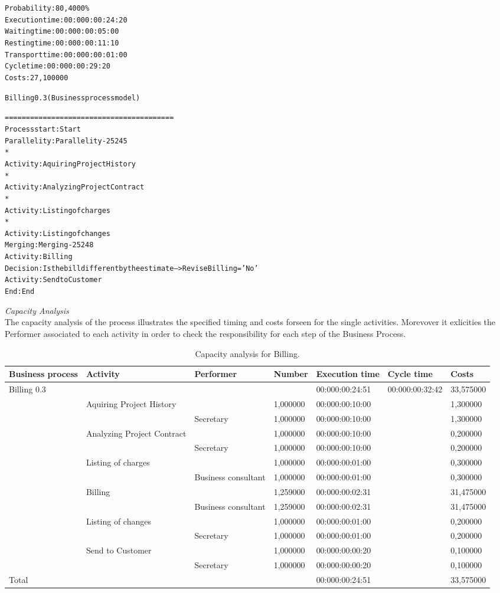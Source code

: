 \begin{alltt}
Probability:   80,4000\%
Execution time:  00:000:00:24:20
Waiting time:  00:000:00:05:00
Resting time:  00:000:00:11:10
Transport time:  00:000:00:01:00
Cycle time:  00:000:00:29:20
Costs:  27,100000

Billing 0.3 (Business process model)

========================================
Process start: Start
Parallelity: Parallelity-25245
    *
    Activity: Aquiring Project History
    *
    Activity: Analyzing Project Contract
    *
    Activity: Listing of charges
    *
    Activity: Listing of changes
Merging: Merging-25248
Activity: Billing
Decision: Is the bill different by the estimate --> ReviseBilling = 'No'
Activity: Send to Customer
End: End
\end{alltt}

\noindent
\emph{Capacity Analysis}\\
The capacity analysis of the process illustrates the specified timing and costs forseen for the single activities. Morevover it exlicities the Performer associated to each activity in order to check the responsibility for each step of the Business Process.

\begin{table}
\centering
{\tiny
\begin{tabular}{|l|l|l|l|l|l|l|}
Business process&Activity&Performer&Number&Execution time&Cycle time&Costs\\
\hline
Billing 0.3&&&&00:000:00:24:51&00:000:00:32:42&33,575000\\
\hline
&Aquiring Project History &&1,000000&00:000:00:10:00&&1,300000\\
\hline
&&Secretary&1,000000&00:000:00:10:00&&1,300000\\
\hline
&Analyzing Project Contract &&1,000000&00:000:00:10:00&&0,200000\\
\hline
&&Secretary&1,000000&00:000:00:10:00&&0,200000\\
\hline
&Listing of charges &&1,000000&00:000:00:01:00&&0,300000\\
\hline
&&Business consultant&1,000000&00:000:00:01:00&&0,300000\\
\hline
&Billing &&1,259000&00:000:00:02:31&&31,475000\\
\hline
&&Business consultant&1,259000&00:000:00:02:31&&31,475000\\
\hline
&Listing of changes &&1,000000&00:000:00:01:00&&0,200000\\
\hline
&&Secretary&1,000000&00:000:00:01:00&&0,200000\\
\hline
&Send to Customer &&1,000000&00:000:00:00:20&&0,100000\\
\hline
&&Secretary&1,000000&00:000:00:00:20&&0,100000\\
\hline
Total&&&&00:000:00:24:51&&33,575000
\end{tabular}
}
\caption{Capacity analysis for Billing.}
\end{table}
%

